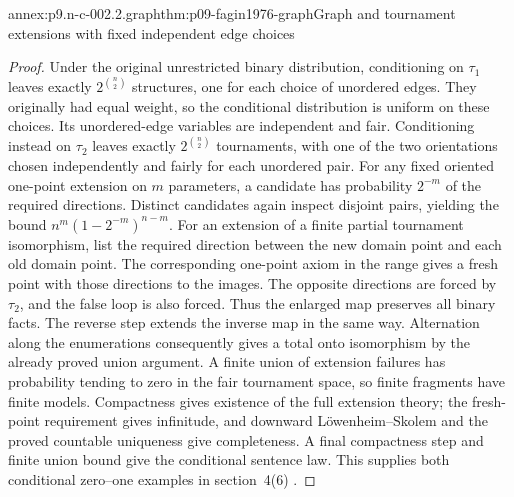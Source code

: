 \begin{annexitem}{annex:p9.n-c-002.2.graph}{thm:p09-fagin1976-graph}{Graph and tournament extensions with fixed independent edge choices}
\begin{proof}
Under the original unrestricted binary distribution, conditioning on
\(\tau_1\) leaves exactly \(2^{\binom n2}\) structures, one for
each choice of unordered edges.  They originally had equal weight, so
the conditional distribution is uniform on these choices.  Its
unordered-edge variables are independent and fair.  Conditioning instead
on \(\tau_2\) leaves exactly \(2^{\binom n2}\) tournaments, with
one of the two orientations chosen independently and fairly for each
unordered pair.  For any fixed oriented one-point extension on \(m\)
parameters, a candidate has probability \(2^{-m}\) of the required
directions.  Distinct candidates again inspect disjoint pairs, yielding
the bound \(n^m(1-2^{-m})^{n-m}\).  For an extension of a finite
partial tournament isomorphism, list the required direction between the
new domain point and each old domain point.  The corresponding one-point
axiom in the range gives a fresh point with those directions to the
images.  The opposite directions are forced by \(\tau_2\), and
the false loop is also forced.  Thus the enlarged map preserves all
binary facts.  The reverse step extends the inverse map in the same way.
Alternation along the enumerations consequently gives a total onto
isomorphism by the already proved union argument.  A finite union of
extension failures has probability tending to zero in the fair
tournament space, so finite fragments have finite models.  Compactness
gives existence of the full extension theory; the fresh-point
requirement gives infinitude, and downward L\"owenheim--Skolem and
the proved countable uniqueness give completeness.  A final compactness
step and finite union bound give the conditional sentence law.  This
supplies both conditional zero--one examples in section~4(6)
\cite[p.~57]{Fagin1976}.
\end{proof}
\end{annexitem}

